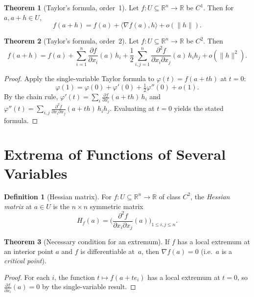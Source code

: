 \documentclass[12pt,a4paper]{book}
\theoremstyle{definition}
\newtheorem{definition}{Definition}[chapter]
\newtheorem{theorem}{Theorem}[chapter]
\begin{document}
\begin{theorem}[Taylor's formula, order~1]
\label{thm:taylor-1}
Let $f\colon U\subseteq\mathbb{R}^n\to\mathbb{R}$ be $C^1$.  Then for
$a,a+h\in U$,
\[
  f(a+h)=f(a)+\langle\nabla f(a),h\rangle + o(\|h\|).
\]
\end{theorem}

\begin{theorem}[Taylor's formula, order~2]
\label{thm:taylor-2}
Let $f\colon U\subseteq\mathbb{R}^n\to\mathbb{R}$ be $C^2$.  Then
\[
  f(a+h)=f(a)+\sum_{i=1}^n \frac{\partial f}{\partial x_i}(a)\,h_i
  +\frac{1}{2}\sum_{i,j=1}^n
    \frac{\partial^2 f}{\partial x_i\partial x_j}(a)\,h_i h_j
  + o(\|h\|^2).
\]
\end{theorem}

\begin{proof}
Apply the single-variable Taylor formula to $\varphi(t)=f(a+th)$ at $t=0$:
\[
  \varphi(1)=\varphi(0)+\varphi'(0)+\tfrac12\varphi''(0)+o(1).
\]
By the chain rule,
$\varphi'(t)=\sum_i \frac{\partial f}{\partial x_i}(a+th)\,h_i$ and
$\varphi''(t)=\sum_{i,j}\frac{\partial^2 f}{\partial x_i\partial x_j}(a+th)\,h_ih_j$.
Evaluating at $t=0$ yields the stated formula.
\end{proof}

\section{Extrema of Functions of Several Variables}
\label{sec:extrema-multi}

\begin{definition}[Hessian matrix]\label{def:hessian}
For $f\colon U\subseteq\mathbb{R}^n\to\mathbb{R}$ of class $C^2$, the
\emph{Hessian matrix} at $a\in U$ is the $n\times n$ symmetric matrix
\[
  H_f(a) = \biggl(\frac{\partial^2 f}{\partial x_i\partial x_j}(a)
  \biggr)_{1\le i,j\le n}.
\]
\end{definition}

\begin{theorem}[Necessary condition for an extremum]
\label{thm:necessary-extremum}
If $f$ has a local extremum at an interior point $a$ and $f$ is
differentiable at~$a$, then $\nabla f(a)=0$ (i.e.\ $a$ is a
\emph{critical point}).
\end{theorem}

\begin{proof}
For each $i$, the function $t\mapsto f(a+te_i)$ has a local extremum at
$t=0$, so $\frac{\partial f}{\partial x_i}(a)=0$ by the single-variable
result.
\end{proof}
\end{document}
